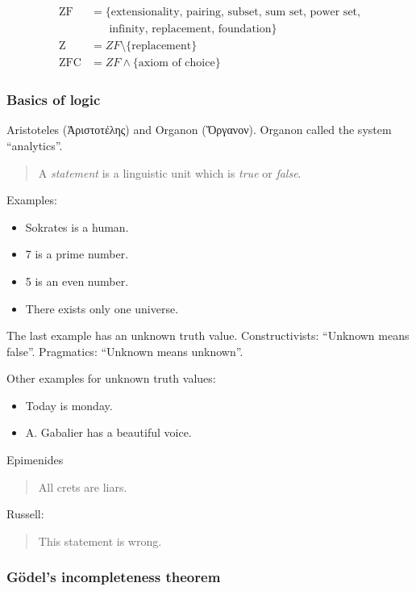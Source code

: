 \documentclass[a4paper,landscape,twocolumn]{article}
\newcommand\textgreek[1]{\begingroup\fontencoding{LGR}\selectfont#1\endgroup}
\begin{document}
\begin{align*}
  \text{ZF}  &= \{\text{extensionality, pairing, subset, sum set, power set,} \\
             & \hspace{20pt}\text{infinity, replacement, foundation}\} \\
  \text{Z}   &= ZF \setminus \{\text{replacement}\} \\
  \text{ZFC} &= ZF \wedge \{\text{axiom of choice}\}
\end{align*}

\subsubsection{Basics of logic}

Aristoteles (\textgreek{Ἀριστοτέλης}) and Organon (\textgreek{Ὄργανον}).
Organon called the system \enquote{analytics}.

\begin{quote}
  A \emph{statement} is a linguistic unit which is \emph{true} or \emph{false}.
\end{quote}

Examples:
\begin{itemize}
  \item Sokrates is a human.
  \item 7 is a prime number.
  \item 5 is an even number.
  \item There exists only one universe.
\end{itemize}

The last example has an unknown truth value.
Constructivists: \enquote{Unknown means false}.
Pragmatics: \enquote{Unknown means unknown}.

Other examples for unknown truth values:
\begin{itemize}
  \item Today is monday.
  \item A. Gabalier has a beautiful voice.
\end{itemize}

Epimenides
\begin{quote}
  All crets are liars.
\end{quote}

Russell:
\begin{quote}
  This statement is wrong.
\end{quote}

\subsubsection{Gödel's incompleteness theorem}
\end{document}
